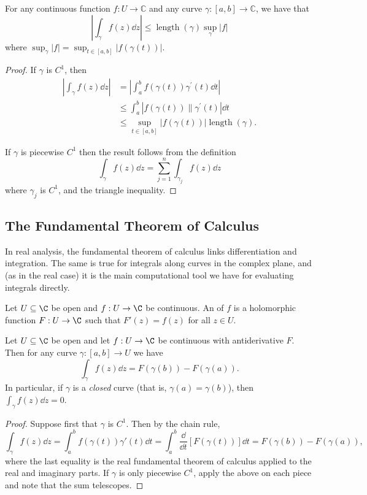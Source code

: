 \begin{proposition}
    For any continuous function $f: U \rightarrow \mathbb{C}$ and any curve $\gamma:[a, b] \rightarrow \mathbb{C}$, we have that
    $$
    \left|\int_{\gamma} f(z) \dd z\right| \leq \operatorname{length}(\gamma) \sup _{\gamma}|f|
    $$
    where $\sup _{\gamma}|f|=\sup _{t \in[a, b]}|f(\gamma(t))|$.
\end{proposition}
\begin{proof}
If $\gamma$ is $C^{1}$, then 
\begin{align*}
\left|\int_{\gamma} f(z) \dd z\right|&=\left|\int_{a}^{b} f(\gamma(t)) \gamma^{\prime}(t) \dd t\right| \\
&\leq\int_{a}^{b}\left|f(\gamma(t)) \| \gamma^{\prime}(t)\right| \dd t \\
&\leq \sup _{t \in[a, b]}|f(\gamma(t))| \operatorname{length}(\gamma).
\end{align*} 

If $\gamma$ is piecewise $C^{1}$ then the result follows from the definition 
$$\int_{\gamma} f(z) \dd z=\sum_{j=1}^{n} \int_{\gamma_{j}} f(z) \dd z$$ 
where $\gamma_{j}$ is $C^{1}$, and the triangle inequality.
\end{proof}

\subsection{The Fundamental Theorem of Calculus}

In real analysis, the fundamental theorem of calculus links differentiation and integration. The same is true for integrals along curves in the complex plane, and (as in the real case) it is the main computational tool we have for evaluating integrals directly.

\begin{definition}[Antiderivative]
    Let $U \subseteq \C$ be open and $f: U \rightarrow \C$ be continuous. An  of $f$ is a holomorphic function $F: U \rightarrow \C$ such that $F'(z) = f(z)$ for all $z \in U$.
\end{definition}

\begin{theorem}
    Let $U \subseteq \C$ be open and let $f : U \rightarrow \C$ be continuous with antiderivative $F$. Then for any curve $\gamma: [a, b] \rightarrow U$ we have
    $$
    \int_\gamma f(z) \dd z = F(\gamma(b)) - F(\gamma(a)).
    $$
    In particular, if $\gamma$ is a \emph{closed} curve (that is, $\gamma(a) = \gamma(b)$), then $\int_\gamma f(z) \dd z = 0$.
\end{theorem}
\begin{proof}
    Suppose first that $\gamma$ is $C^1$. Then by the chain rule,
    $$
    \int_\gamma f(z) \dd z = \int_a^b f(\gamma(t)) \gamma'(t) \dd t = \int_a^b \frac{\dd}{\dd t}\left[F(\gamma(t))\right] \dd t = F(\gamma(b)) - F(\gamma(a)),
    $$
    where the last equality is the real fundamental theorem of calculus applied to the real and imaginary parts. If $\gamma$ is only piecewise $C^1$, apply the above on each piece and note that the sum telescopes.
\end{proof}

